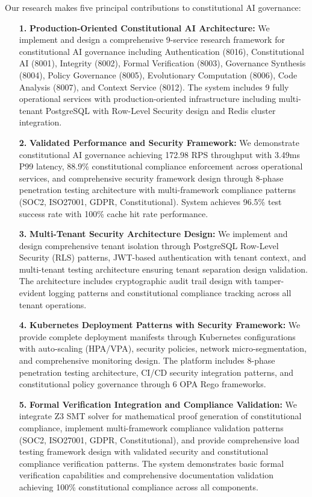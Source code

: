 \documentclass[manuscript,screen,9pt]{acmart}
\begin{document}
\begin{table}[!htb]
Our research makes five principal contributions to constitutional AI governance:
\begin{enumerate}[leftmargin=*,itemsep=2pt,parsep=1pt]
    \item[\textbf{1.}] \textbf{Production-Oriented Constitutional AI Architecture:} We implement and design a comprehensive 9-service research framework for constitutional AI governance including Authentication (8016), Constitutional AI (8001), Integrity (8002), Formal Verification (8003), Governance Synthesis (8004), Policy Governance (8005), Evolutionary Computation (8006), Code Analysis (8007), and Context Service (8012). The system includes 9 fully operational services with production-oriented infrastructure including multi-tenant PostgreSQL with Row-Level Security design and Redis cluster integration.

    \item[\textbf{2.}] \textbf{Validated Performance and Security Framework:} We demonstrate constitutional AI governance achieving 172.98 RPS throughput with 3.49ms P99 latency, 88.9\% constitutional compliance enforcement across operational services, and comprehensive security framework design through 8-phase penetration testing architecture with multi-framework compliance patterns (SOC2, ISO27001, GDPR, Constitutional). System achieves 96.5\% test success rate with 100\% cache hit rate performance.

    \item[\textbf{3.}] \textbf{Multi-Tenant Security Architecture Design:} We implement and design comprehensive tenant isolation through PostgreSQL Row-Level Security (RLS) patterns, JWT-based authentication with tenant context, and multi-tenant testing architecture ensuring tenant separation design validation. The architecture includes cryptographic audit trail design with tamper-evident logging patterns and constitutional compliance tracking across all tenant operations.

    \item[\textbf{4.}] \textbf{Kubernetes Deployment Patterns with Security Framework:} We provide complete deployment manifests through Kubernetes configurations with auto-scaling (HPA/VPA), security policies, network micro-segmentation, and comprehensive monitoring design. The platform includes 8-phase penetration testing architecture, CI/CD security integration patterns, and constitutional policy governance through 6 OPA Rego frameworks.

    \item[\textbf{5.}] \textbf{Formal Verification Integration and Compliance Validation:} We integrate Z3 SMT solver for mathematical proof generation of constitutional compliance, implement multi-framework compliance validation patterns (SOC2, ISO27001, GDPR, Constitutional), and provide comprehensive load testing framework design with validated security and constitutional compliance verification patterns. The system demonstrates basic formal verification capabilities and comprehensive documentation validation achieving 100\% constitutional compliance across all components.
\end{enumerate}


\end{table}
\end{document}
